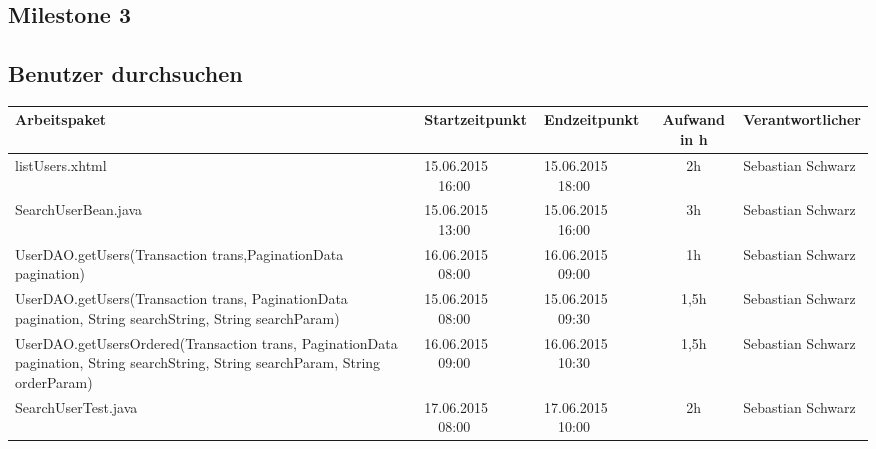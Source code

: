 \begin{landscape}
	\section{Milestone 3}	
	
	\subsection{Benutzer durchsuchen}
	\begin{tabular}{|p{10.3cm}|p{3.2cm}|p{3.2cm}|c|p{3.5cm}|}
		\hline  \textbf{Arbeitspaket} & \textbf{Startzeitpunkt} & \textbf{Endzeitpunkt} & \textbf{Aufwand in h} & \textbf{Verantwortlicher} \\ 
		\hline   listUsers.xhtml                                               & 15.06.2015 \ \ 16:00       & 15.06.2015 \ \ 18:00        & 2h                 & Sebastian Schwarz\\  
		\hline   SearchUserBean.java                                           & 15.06.2015 \ \ 13:00       & 15.06.2015 \ \ 16:00        & 3h                 & Sebastian Schwarz\\  
		\hline   UserDAO.getUsers(Transaction trans,PaginationData pagination) & 16.06.2015 \ \ 08:00       & 16.06.2015 \ \ 09:00        & 1h                 & Sebastian Schwarz\\  
		\hline   UserDAO.getUsers(Transaction trans, PaginationData pagination, String searchString, String searchParam) & 15.06.2015 \ \ 08:00       & 15.06.2015 \ \ 09:30        & 1,5h                 & Sebastian Schwarz\\  
		\hline   UserDAO.getUsersOrdered(Transaction trans, PaginationData pagination, String searchString, String searchParam, String orderParam)    & 16.06.2015 \ \ 09:00       & 16.06.2015 \ \ 10:30        & 1,5h                 & Sebastian Schwarz\\  
		\hline SearchUserTest.java      &   17.06.2015 \ \ 08:00         &  17.06.2015 \ \ 10:00          &        2h           & Sebastian Schwarz \\
		\hline 
	\end{tabular} \ \\
	\ \\
	

\end{landscape}

